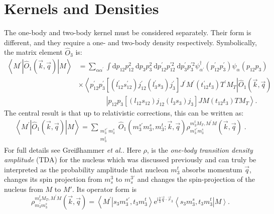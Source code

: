\documentclass[a4paper,11pt]{article}
\newcommand{\etal}{\textit{et al.}}
\newcommand\bv[1]{\vec{#1}}
\begin{document}
\section{Kernels and Densities}
The one-body and two-body kernel must be considered separately.
Their form is different, and they require a one- and
two-body density respectively.
Symbolically, the matrix element $\hat{O}_3$ is:
\begin{align}
  \left\langle M^{\prime}\left|\hat{O}_{1}(\bv{k}, \bv{q})\right|
  M\right\rangle&=\sum_{\alpha \alpha^{\prime}} \int \mathrm{d}
  p_{12} p_{12}^{2} \mathrm{~d} p_{3} p_{3}^{2} \mathrm{~d}
  p_{12}^{\prime} p_{12}^{\prime 2} \mathrm{~d} p_{3}^{\prime}
  p_{3}^{\prime 2}
  \psi_{\alpha^{\prime}}^{\dagger}\left(p_{12}^{\prime}
  p_{3}^{\prime}\right) \psi_{\alpha}\left(p_{12} p_{3}\right)\nonumber \\
  &\times\left\langle p_{12}^{\prime}
  p_{3}^{\prime}\left[\left(l_{12}^{\prime} s_{12}^{\prime}\right)
    j_{12}^{\prime}\left(l_{3}^{\prime} s_{3}\right)
  j_{3}^{\prime}\right] J^{\prime} M^{\prime}\left(t_{12}^{\prime}
  t_{3}\right) T^{\prime} M_{T}\right| \hat{O}_{1}(\bv{k}, \bv{q})
  \label{onebodFull}\\
  &\qquad\qquad\left|p_{12} p_{3}\left[\left(l_{12} s_{12}\right)
  j_{12}\left(l_{3} s_{3}\right) j_{3}\right] J M\left(t_{12}
  t_{3}\right) T M_{T}\right\rangle.\nonumber
\end{align}
The central result is that up to relativistic corrections, this can
be written as:
\begin{align}
  \left\langle M^{\prime}\left|\hat{O}_{1}(\bv{k}, \bv{q})\right|
  M\right\rangle=\sum_{\substack{m_{3}^{s \prime}\,
  m_{3}^{s}\\m_3^t}}\hat{O}_{1}\left(m_{3}^{s \prime} m_{3}^{s},
  m_{3}^{t} ;  \bv{k}, \bv{q}\right) \rho_{m_{3}^{s \prime}
  m_{3}^{s}}^{m_3^{t} M_{T}, M^{\prime} M}(\bv{k}, \bv{q})\label{onebodyOrig}\;.
\end{align}
For full details see Grei{\ss}hammer \etal\cite{hammer2020}.
Here $\rho$, is the \textit{one-body transition density amplitude} (TDA)
for the nucleus which was discussed previously and can truly be
interpreted as the probability amplitude that nucleon $m_3^t$ absorbs
momentum $\bv{q}$, changes its spin projection from $m_s^3$ to
$m_s^{3'}$ and changes the spin-projection of the nucleus from $M$ to
$M'$. Its operator form is
\begin{equation}
  \rho_{m_{3}^{\prime} m_{3}^{s}}^{m_{3}^{t} M_{T}, M^{\prime}
  M}(\bv{k}, \bv{q})=\left\langle M^{\prime}\right.\left|s_{3}
  m_{3}^{s \prime}, t_{3} m_{3}^{t}\right\rangle
  \mathrm{e}^{\mathrm{i} \frac{2}{3} \bv{q} \cdot
  \bv{r}_{3}}\left\langle s_{3} m_{3}^{s}, t_{3}
  m_{3}^{t}\right|\left. M\right\rangle\label{onebodydens}.
\end{equation}
\end{document}
